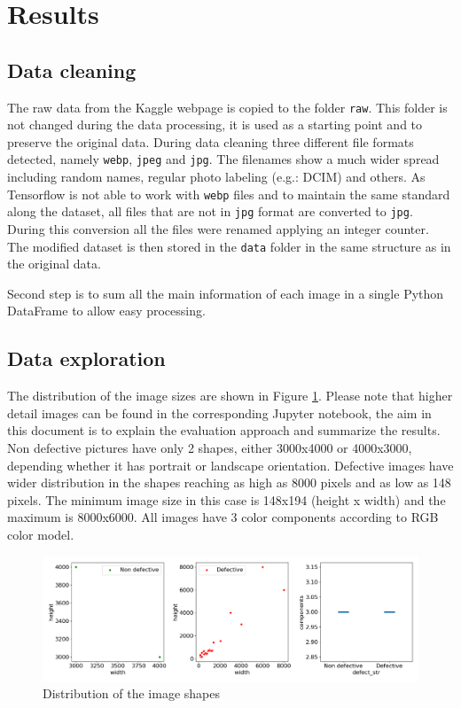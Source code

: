 \documentclass[10pt, final]{article}
\begin{document}
	\section{Results} \label{sec:results}
		\subsection{Data cleaning}			
			The raw data from the Kaggle webpage \cite{noauthor_railway_nodate} is copied to the folder \lstinline{raw}.
			This folder is not changed during the data processing, it is used as a starting point and to preserve the 
			original data.
			During data cleaning three different file formats detected, namely \lstinline{webp}, \lstinline{jpeg} 
			and \lstinline{jpg}.
			The filenames show a much wider spread including random names, regular photo labeling (e.g.: DCIM) and others.
			As Tensorflow is not able to work with \lstinline{webp} files and to maintain the same standard along
			the dataset, all files that are not in \lstinline{jpg} format are converted to \lstinline{jpg}.
			During this conversion all the files were renamed applying an integer counter.
			The modified dataset is then stored in the \lstinline{data} folder in the same structure as in the original data.
			
			Second step is to sum all the main information of each image in a single Python DataFrame to allow easy processing.
		\subsection{Data exploration}
			The distribution of the image sizes are shown in Figure \ref{fig:shape_dist}. 
			Please note that higher detail images can be found in the corresponding Jupyter notebook, the aim in this document
			is to explain the evaluation approach and summarize the results.
			Non defective pictures have only 2 shapes, either 3000x4000 or 4000x3000, depending whether it has
			portrait or landscape orientation.
			Defective images have wider distribution in the shapes reaching as high as 8000 pixels and as low as 148 pixels.
			The minimum image size in this case is 148x194 (height x width) and the maximum is 8000x6000.
			All images have 3 color components according to RGB color model.
			\begin{figure}[!ht]
				\centering
				\includegraphics[width=\textwidth]{./plots/shapes.png}
				\caption{Distribution of the image shapes}
				\label{fig:shape_dist}
			\end{figure}
\end{document}
